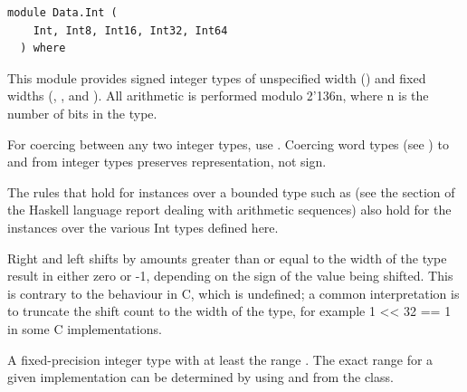 \label{module:Data.Int}
\haddockbeginheader
{\haddockverb\begin{verbatim}
module Data.Int (
    Int, Int8, Int16, Int32, Int64
  ) where\end{verbatim}}
\haddockendheader

This module provides signed integer types of unspecified width () and
 fixed widths (, ,  and ). All arithmetic is
 performed modulo 2{\char '136}n, where n is the number of bits in the type.\par
For coercing between any two integer types, use . Coercing word
 types (see ) to and from integer types preserves representation,
 not sign.\par
The rules that hold for  instances over a bounded type such as 
 (see the section of the Haskell language report dealing with arithmetic
 sequences) also hold for the  instances over the various Int types
 defined here.\par
Right and left shifts by amounts greater than or equal to the width of the
 type result in either zero or -1, depending on the sign of the value being
 shifted. This is contrary to the behaviour in C, which is undefined; a common
 interpretation is to truncate the shift count to the width of the type, for
 example 1 << 32 == 1 in some C implementations.\par
\begin{haddockdesc}
\item[\begin{tabular}{@{}l}
data Int
\end{tabular}]
{\haddockbegindoc
A fixed-precision integer type with at least the range .
 The exact range for a given implementation can be determined by using
  and  from the  class.\par}
\end{haddockdesc}

